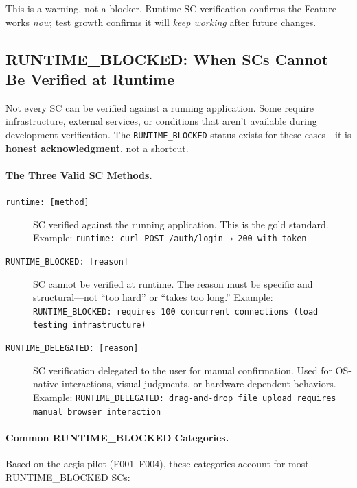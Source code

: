 \documentclass[11pt,a4paper,openright,twoside]{report}
\begin{document}
This is a warning, not a blocker. Runtime SC verification confirms the Feature works \emph{now}; test growth confirms it will \emph{keep working} after future changes.

\subsection{RUNTIME\_BLOCKED: When SCs Cannot Be Verified at Runtime}

Not every SC can be verified against a running application. Some require infrastructure, external services, or conditions that aren't available during development verification. The \texttt{RUNTIME\_BLOCKED} status exists for these cases---it is \textbf{honest acknowledgment}, not a shortcut.

\paragraph{The Three Valid SC Methods.}

\begin{description}
  \item[\texttt{runtime: [method]}] SC verified against the running application. This is the gold standard. Example: \texttt{runtime: curl POST /auth/login → 200 with token}
  \item[\texttt{RUNTIME\_BLOCKED: [reason]}] SC cannot be verified at runtime. The reason must be specific and structural---not ``too hard'' or ``takes too long.'' Example: \texttt{RUNTIME\_BLOCKED: requires 100 concurrent connections (load testing infrastructure)}
  \item[\texttt{RUNTIME\_DELEGATED: [reason]}] SC verification delegated to the user for manual confirmation. Used for OS-native interactions, visual judgments, or hardware-dependent behaviors. Example: \texttt{RUNTIME\_DELEGATED: drag-and-drop file upload requires manual browser interaction}
\end{description}

\paragraph{Common RUNTIME\_BLOCKED Categories.}

Based on the aegis pilot (F001--F004), these categories account for most RUNTIME\_BLOCKED SCs:
\end{document}
